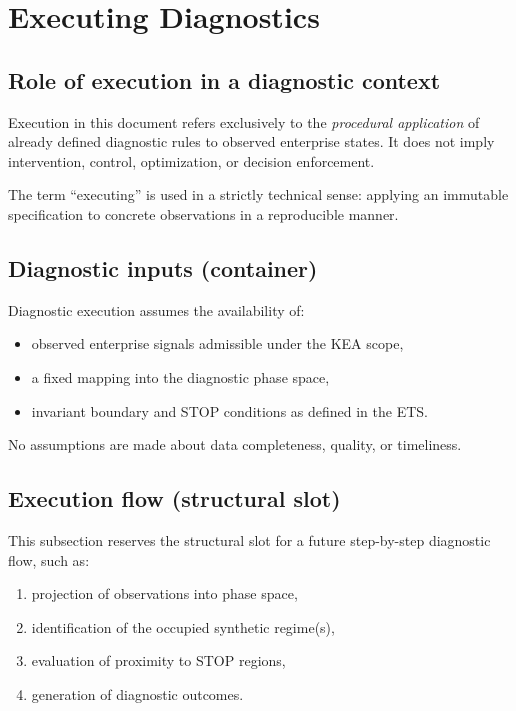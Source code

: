
\section{Executing Diagnostics}
\label{sec:executing-diagnostics}

\subsection{Role of execution in a diagnostic context}
Execution in this document refers exclusively to the \emph{procedural application}
of already defined diagnostic rules to observed enterprise states.
It does not imply intervention, control, optimization, or decision enforcement.

The term “executing” is used in a strictly technical sense: applying an immutable
specification to concrete observations in a reproducible manner.

\subsection{Diagnostic inputs (container)}
Diagnostic execution assumes the availability of:
\begin{itemize}
  \item observed enterprise signals admissible under the KEA scope,
  \item a fixed mapping into the diagnostic phase space,
  \item invariant boundary and STOP conditions as defined in the ETS.
\end{itemize}

No assumptions are made about data completeness, quality, or timeliness.

\subsection{Execution flow (structural slot)}
This subsection reserves the structural slot for a future step-by-step
diagnostic flow, such as:
\begin{enumerate}
  \item projection of observations into phase space,
  \item identification of the occupied synthetic regime(s),
  \item evaluation of proximity to STOP regions,
  \item generation of diagnostic outcomes.
\end{enumerate}

